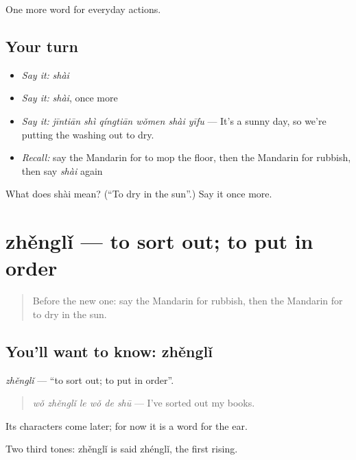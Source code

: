 \begin{grammarlens}[title={What you've built}]
One more word for everyday actions.
\end{grammarlens}

\subsection*{Your turn}
\begin{itemize}
\raggedright
  \item \emph{Say it:} \emph{shài}
  \item \emph{Say it:} \emph{shài}, once more
  \item \emph{Say it:} \emph{jīntiān shì qíngtiān wǒmen shài yīfu} — It's a sunny day, so we're putting the washing out to dry.
  \item \emph{Recall:} say the Mandarin for to mop the floor, then the Mandarin for rubbish, then say \emph{shài} again
\end{itemize}

\begin{tcolorbox}[breakable,colback=teal!4,colframe=teal!35!black,title={Before you move on}]
What does shài mean? (\textquotedblleft{}To dry in the sun\textquotedblright{}.) Say it once more.
\end{tcolorbox}
\section[zhěnglǐ]{zhěnglǐ — to sort out; to put in order}

\label{lesson:ZH-C142-zhengli}



\begin{quote}
Before the new one: say the Mandarin for rubbish, then the Mandarin for to dry in the sun.
\end{quote}

\subsection*{You'll want to know: zhěnglǐ}
\emph{zhěnglǐ} — \textquotedblleft{}to sort out; to put in order\textquotedblright{}.

\begin{quote}
\emph{wǒ zhěnglǐ le wǒ de shū} — I've sorted out my books.
\end{quote}

Its characters come later; for now it is a word for the ear.

Two third tones: zhěnglǐ is said zhénglǐ, the first rising.

